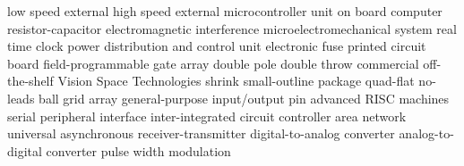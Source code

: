      {low speed external}
     {high speed external}
     {microcontroller unit}
     {on board computer}
      {resistor-capacitor}
     {electromagnetic interference}
    {microelectromechanical system}
     {real time clock}
    {power distribution and control unit}
   {electronic fuse}
     {printed circuit board}
    {field-programmable gate array}
    {double pole double throw}
    {commercial off-the-shelf}
     {Vision Space Technologies}
    {shrink small-outline package}
     {quad-flat no-leads}
     {ball grid array}
    {general-purpose input/output pin}
     {advanced RISC machines}
     {serial peripheral interface}
     {inter-integrated circuit}
     {controller area network}
    {universal asynchronous receiver-transmitter}
     {digital-to-analog converter}
     {analog-to-digital converter}
     {pulse width modulation}
